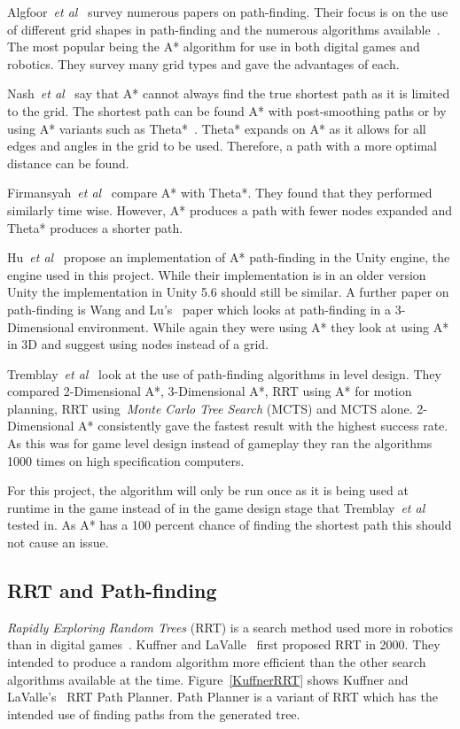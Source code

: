 \documentclass[journal]{IEEEtran}
\begin{document}
	Algfoor~\textit{et al}~\cite{Algfoor2015} survey numerous papers on path-finding. Their focus is on the use of different grid shapes in path-finding and the numerous algorithms available~\cite{Algfoor2015}. The most popular being the A* algorithm for use in both digital games and robotics. They survey many grid types and gave the advantages of each. 
	
	Nash~\textit{et al}~\cite{Nash2007} say that A* cannot always find the true shortest path as it is limited to the grid. The shortest path can be found A* with post-smoothing paths or by using A* variants such as Theta*~\cite{Nash2007, Firmansyah2016}. Theta* expands on A* as it allows for all edges and angles in the grid to be used. Therefore, a path with a more optimal distance can be found.
	
	Firmansyah~\textit{et al}~\cite{Firmansyah2016} compare A* with Theta*. They found that they performed similarly time wise. However, A* produces a path with fewer nodes expanded and Theta* produces a shorter path. 
	
	Hu~\textit{et al}~\cite{Hu2012} propose an implementation of A* path-finding in the Unity engine, the engine used in this project.  While their implementation is in an older version Unity the implementation in Unity 5.6 should still be similar. A further paper on path-finding is Wang and Lu's~\cite{wang2012} paper which looks at path-finding in a 3-Dimensional environment. While again they were using A* they look at using A* in 3D and suggest using nodes instead of a grid.
	
	Tremblay~\textit{et al}~\cite{Tremblay2014} look at the use of path-finding algorithms in level design. They compared 2-Dimensional A*, 3-Dimensional A*, RRT using A* for motion planning, RRT using~\textit{Monte Carlo Tree Search} (MCTS) and MCTS alone. 2-Dimensional A* consistently gave the fastest result with the highest success rate. As this was for game level design instead of gameplay they ran the algorithms 1000 times on high specification computers. 
	
	For this project, the algorithm will only be run once as it is being used at runtime in the game instead of in the game design stage that Tremblay~\textit{et al}~\cite{Tremblay2014} tested in. As A* has a 100 percent chance of finding the shortest path this should not cause an issue. 
	
	\subsection{RRT and Path-finding} \label{RRTadnPathfinding}
	\textit{Rapidly Exploring Random Trees} (RRT) is a search method used more in robotics than in digital games~\cite{LaValle1998, Kuffner2000}. Kuffner and LaValle~\cite{Kuffner2000} first proposed RRT in 2000. They intended to produce a random algorithm more efficient than the other search algorithms available at the time.  Figure~\ref{KuffnerRRT} shows Kuffner and LaValle's~\cite{Kuffner2000} RRT Path Planner. Path Planner is a variant of RRT which has the intended use of finding paths from the generated tree.
	
\end{document}
